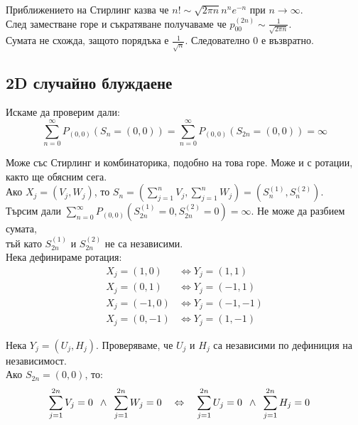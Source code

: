 \documentclass{article}
\begin{document}
Приближението на Стирлинг казва че $n! \sim \sqrt{2\pi n}n^n e^{-n}$ при $n \to \infty$. \\

След заместване горе и съкратяване получаваме че $p_{00}^{(2n)} \sim \frac{1}{\sqrt{2\pi n}}$. \\

Сумата не схожда, защото порядъка е $\frac{1}{\sqrt{n}}$. Следователно 0 е възвратно.

\subsection{2D случайно блуждаене}
Искаме да проверим дали:
$$\sum_{n=0}^\infty P_{(0,0)}(S_n = (0,0)) = \sum_{n=0}^\infty P_{(0,0)}(S_{2n} = (0,0)) = \infty$$

Може със Стирлинг и комбинаторика, подобно на това горе. Може и с ротации, както ще обясним сега. \\

Ако $X_j = (V_j, W_j)$, то $S_n = \left(\sum_{j=1}^n V_j, \sum_{j=1}^n W_j\right) = (S_n^{(1)}, S_n^{(2)})$. \\

Търсим дали $\sum_{n=0}^\infty P_{(0,0)}(S_{2n}^{(1)} = 0, S_{2n}^{(2)} = 0) = \infty$. Не може да разбием сумата, \\
тъй като $S_{2n}^{(1)}$ и $S_{2n}^{(2)}$ не са независими. \\

Нека дефинираме ротация:
\begin{align*}
X_j = (1,0) &\Leftrightarrow Y_j = (1,1) \\
X_j = (0,1) &\Leftrightarrow Y_j = (-1,1) \\
X_j = (-1,0) &\Leftrightarrow Y_j = (-1,-1) \\
X_j = (0,-1) &\Leftrightarrow Y_j = (1,-1)
\end{align*}

Нека $Y_j = (U_j, H_j)$. Проверяваме, че $U_j$ и $H_j$ са независими по дефиниция на независимост. \\

Ако $S_{2n} = (0,0)$, то:
\begin{align*}
\sum_{j=1}^{2n} V_j = 0 \hspace{0.5em} \land \hspace{0.5em} \sum_{j=1}^{2n} W_j = 0 \quad &\Leftrightarrow \quad \sum_{j=1}^{2n} U_j = 0  \hspace{0.5em} \land \hspace{0.5em}
\sum_{j=1}^{2n} H_j = 0
\end{align*}
\end{document}
